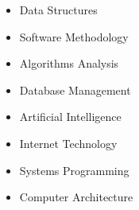 \begin{multicols}{4}
    \begin{itemize}[itemsep=-5pt, parsep=3pt]
        \item\small Data Structures
        \item Software Methodology
        \item Algorithms Analysis
        \item Database Management
        \item Artificial Intelligence
        \item Internet Technology
        \item Systems Programming
        \item Computer Architecture
    \end{itemize}
\end{multicols}
\vspace*{2.0\multicolsep}

